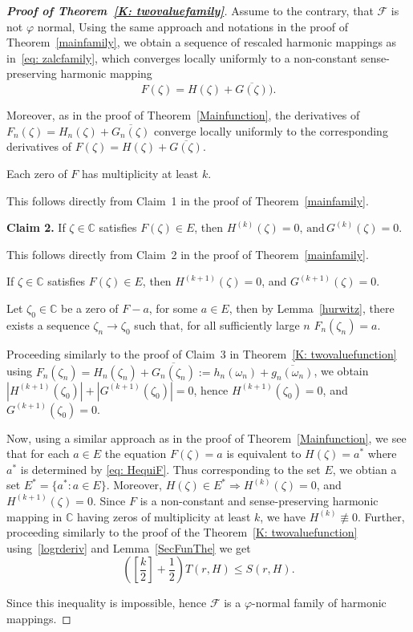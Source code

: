 \documentclass[11pt, reqno]{amsart}
\numberwithin{equation}{section}
\theoremstyle{definition}
\theoremstyle{remark}
\theoremstyle{plain}
\begin{document}
\begin{proof}[\bf{Proof of Theorem~\ref{K: twovaluefamily}}]
  Assume to the contrary, that $\mathcal{F}$ is not $\varphi$ normal,
  Using the same approach and notations in the proof of 
  Theorem~\ref{mainfamily}, we obtain
   a sequence of rescaled harmonic mappings as in~\eqref{eq: zalcfamily}, which
  converges locally uniformly to a non-constant sense-preserving
  harmonic mapping
  \[
  F(\zeta)=H(\zeta)+\overline{G(\zeta)}).
  \] 

Moreover, as in the proof of Theorem~\ref{Mainfunction}, the derivatives
of $F_n(\zeta)=H_n(\zeta)+\overline{G_n(\zeta)}$ converge locally 
uniformly to the corresponding 
derivatives of $F(\zeta)=H(\zeta)+\overline{G(\zeta)}.$\smallskip

 Each zero of $F$ has multiplicity at least $k$.
\smallskip

This follows directly from Claim~1 in the proof of
Theorem~\ref{mainfamily}.
\smallskip

\noindent
\textbf{Claim 2.}
If $\zeta \in \mathbb{C}$ satisfies $F(\zeta)\in E$, then
$
H^{(k)}(\zeta)=0,
\, \text{and}\,
G^{(k)}(\zeta)=0.
$\smallskip

This follows directly from Claim~2 in the proof of
Theorem~\ref{mainfamily}.
 \smallskip


 If $\zeta \in \mathbb{C}$ satisfies $F(\zeta)\in E$, then
$
H^{(k+1)}(\zeta)=0$, and $G^{(k+1)}(\zeta)=0$.\smallskip

Let $\zeta_0 \in \mathbb{C}$ be a zero of $F-a$,
for some $a\in E$, 
then by Lemma~\ref{hurwitz}, there exists a sequence 
$\zeta_n \to \zeta_0$
 such that, for all sufficiently large $n$
$ F_n(\zeta_n)=a$.
 \smallskip
 
 Proceeding similarly to the proof of Claim~3 in
 Theorem~\ref{K: twovaluefunction} using $F_n(\zeta_n)=
 H_n(\zeta_n)+\overline{G_n(\zeta_n)}:=
 h_n(\omega_n)+\overline{g_n(\omega_n)}$, we obtain
 $|H^{(k+1)}(\zeta_0)|+|G^{(k+1)}(\zeta_0)|=0$, hence $H^{(k+1)}(\zeta_0)=0$, and 
 $G^{(k+1)}(\zeta_0)=0$.\smallskip

Now, using a similar approach as in the proof of Theorem~\ref{Mainfunction}, we see that 
for each $a\in E$ the equation $F(\zeta)=a$ is equivalent to $H(\zeta)=a^*$ where $a^*$
 is determined by \eqref{eq: HequiF}.  Thus  
 corresponding to the set $E$, we obtian a set $E^*=\{a^*: a\in E\}$. Moreover,
 $H(\zeta)\in E^*\Longrightarrow H^{(k)}(\zeta)=0$, and 
 $H^{(k+1)}(\zeta)=0$. Since $F$ 
is a non-constant and sense-preserving harmonic mapping in
 $\mathbb{C}$ having zeros of multiplicity at least
$k$, we have $H^{(k)}\not\equiv 0$.
 Further, proceeding similarly to the proof of the 
 Theorem~\ref{K: twovaluefunction} using~\eqref{logrderiv}
  and Lemma~\ref{SecFunThe} we 
 get
\begin{equation*}
  \left(\left[\frac{k}{2}\right]+\frac{1}{2}\right)
  T(r, H) \leq S(r, H).
\end{equation*} 

Since this inequality is impossible,
hence $\mathcal{F}$ 
is a $\varphi$-normal family of harmonic mappings.
\end{proof}
\end{document}
